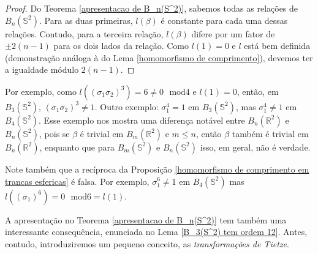 \documentclass[a4paper,portuguese,11pt,twoside, leqno]{book}
\theoremstyle{definition}
\begin{document}
	\begin{proof}
		Do Teorema \eqref{apresentacao de B_n(S^2)}, sabemos todas as relações de $B_n(\mathbb{S}^2)$. Para as duas primeiras, $l(\beta)$ é constante para cada uma dessas relações. Contudo, para a terceira relação, $l(\beta)$ difere por um fator de $\pm2(n-1)$ para os dois lados da relação. Como $l(1) = 0$ e $l$ está bem definida (demonstração análoga à do Lema \eqref{homomorfismo de comprimento}), devemos ter a igualdade módulo $2(n-1)$.
	\end{proof}
	
	\par\vspace{0.3cm} Por exemplo, como $l((\sigma_1\sigma_2)^3) = 6\neq 0\text{ }\mathrm{mod}4$ e $l(1) = 0$, então, em $B_3(\mathbb{S}^2)$, $(\sigma_1\sigma_2)^3\neq 1$. Outro exemplo: $\sigma_1^4=1$ em $B_3(\mathbb{S}^2)$, mas $\sigma_1^4\neq1$ em $B_4(\mathbb{S}^2)$. Esse exemplo nos mostra uma diferença notável entre $B_n(\mathbb{R}^2)$ e $B_n(\mathbb{S}^2)$, pois se $\beta$ é trivial em $B_m(\mathbb{R}^2)$ e $m\leq n$, então $\beta$ também é trivial em $B_n(\mathbb{R}^2)$, enquanto que para $B_m(\mathbb{S}^2)$ e $B_n(\mathbb{S}^2)$ isso, em geral, não é verdade.
	\par\vspace{0.3cm} Note também que a recíproca da Proposição \eqref{homomorfismo de comprimento em trancas esfericas} é falsa. Por exemplo, $\sigma_1^6\neq1$ em $B_4(\mathbb{S}^2)$ mas $l((\sigma_1)^6) = 0\text{ }\mathrm{mod}6 = l(1)$.
	\par\vspace{0.3cm} A apresentação no Teorema \eqref{apresentacao de B_n(S^2)} tem também uma interessante consequência, enunciada no Lema \eqref{B_3(S^2) tem ordem 12}. Antes, contudo, introduziremos um pequeno conceito, as \textit{transformações de Tietze}.
\end{document}

